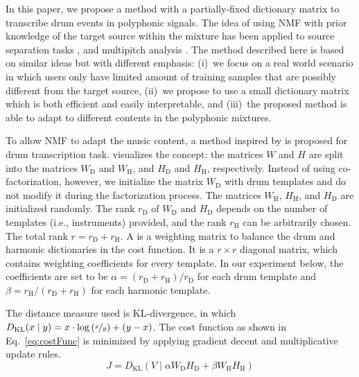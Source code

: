 \documentclass{article}
\begin{document}
In this paper, we propose a method with a partially-fixed dictionary matrix to transcribe drum events in polyphonic signals. The idea of using NMF with prior knowledge of the target source within the mixture has been applied to source separation tasks \cite{smaragdis_ssnmf_2007}, and multipitch analysis \cite{raczynski_Hnmf_2007}. The method described here is based on similar ideas but with different emphasis: 
(i)~we focus on a real world scenario in which users only have limited amount of training samples that are possibly different from the target source, 
(ii)~we propose to use a small dictionary matrix which is both efficient and easily interpretable, and
(iii)~the proposed method is able to adapt to different contents in the polyphonic mixtures.

To allow NMF to adapt the music content, a method inspired by \cite{yoo_nonnegative_2010} is proposed for drum transcription task.  visualizes the concept: the matrices $W$ and $H$ are split into the  matrices $W_\mathrm{D}$ and $W_\mathrm{H}$, and  $H_\mathrm{D}$ and $H_\mathrm{H}$, respectively. Instead of using co-factorization, however, we initialize the matrix $W_\mathrm{D}$ with drum templates and do not modify it during the factorization process. The matrices $W_\mathrm{H}$, $H_\mathrm{H}$, and $H_\mathrm{D}$ are initialized randomly. The rank $r_\mathrm{D}$ of $W_\mathrm{D}$ and $H_\mathrm{D}$ depends on the number of templates (i.e., instruments) provided, and the rank $r_\mathrm{H}$ can be arbitrarily chosen. The total rank $r = r_\mathrm{D} + r_\mathrm{H}$. A is a weighting matrix to balance the drum and harmonic dictionaries in the cost function. It is a $r \times r$ diagonal matrix, which contains weighting coefficients for every template. In our experiment below, the coefficients are set to be $\alpha = (r_\mathrm{D} + r_\mathrm{H})/ r_\mathrm{D}$ for each drum template and $\beta = r_\mathrm{H}/ (r_\mathrm{D} + r_\mathrm{H})$ for each harmonic template.

The distance measure used is KL-divergence, in which \(D_\mathrm{KL}(x \mid y) = x\cdot\log\left(\nicefrac{x}{y}\right) + (y - x)\). %
The cost function as shown in Eq.~\eqref{eq:costFunc} is minimized by applying gradient decent and multiplicative update rules. 
\begin{equation}
\label{eq:costFunc}
J = D_\mathrm{KL}(V \mid \alpha W_\mathrm{D}H_\mathrm{D} + \beta W_\mathrm{H}H_\mathrm{H})
\end{equation}
\end{document}

